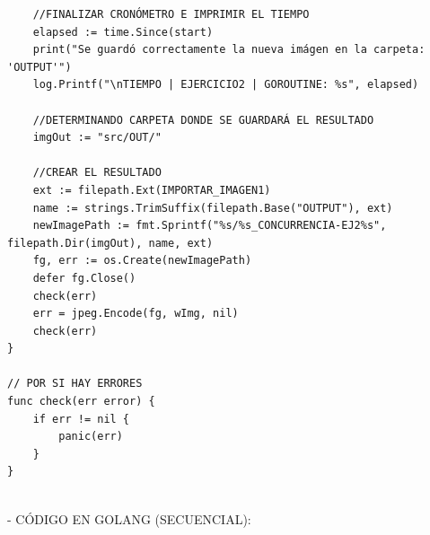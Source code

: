 \documentclass{article}
\begin{document}
\begin{verbatim}
	//FINALIZAR CRONÓMETRO E IMPRIMIR EL TIEMPO
	elapsed := time.Since(start)
	print("Se guardó correctamente la nueva imágen en la carpeta: 'OUTPUT'")
	log.Printf("\nTIEMPO | EJERCICIO2 | GOROUTINE: %s", elapsed)

	//DETERMINANDO CARPETA DONDE SE GUARDARÁ EL RESULTADO
	imgOut := "src/OUT/"

	//CREAR EL RESULTADO
	ext := filepath.Ext(IMPORTAR_IMAGEN1)
	name := strings.TrimSuffix(filepath.Base("OUTPUT"), ext)
	newImagePath := fmt.Sprintf("%s/%s_CONCURRENCIA-EJ2%s", filepath.Dir(imgOut), name, ext)
	fg, err := os.Create(newImagePath)
	defer fg.Close()
	check(err)
	err = jpeg.Encode(fg, wImg, nil)
	check(err)
}

// POR SI HAY ERRORES
func check(err error) {
	if err != nil {
		panic(err)
	}
}
\end{verbatim}
\\
- CÓDIGO EN GOLANG (SECUENCIAL):
\end{document}
